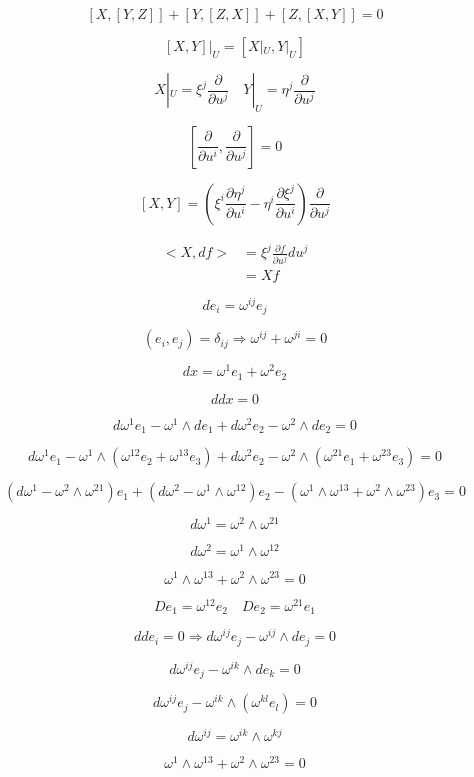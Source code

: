 \documentclass[12pt,a4paper]{article}
\begin{document}
\[
[X,[Y,Z]] + [Y,[Z,X]]+[Z,[X,Y]] = 0
\]


\[
[X,Y]|_U = [X|_U,Y|_U]
\]

\[
X|_U = \xi^j\frac{\partial}{\partial u^j} \quad Y|_U = \eta^j\frac{\partial}{\partial u^j} 
\]


\[
 [\frac{\partial}{\partial u^i},\frac{\partial}{\partial u^j}] = 0
\]

\[
[X,Y] = (\xi^i\frac{\partial\eta^j}{\partial u^i} - \eta^i\frac{\partial\xi^j}{\partial u^i})\frac{\partial}{\partial u^j} 
\]




\begin{align*}
<X,df> &=  \displaystyle \xi^j\frac{\partial f}{\partial u^j}du^j\\
& = Xf
\end{align*}






\[
de_i = \omega^{ij}e_j
\]

\[
(e_i,e_j) = \delta_{ij} \Rightarrow \omega^{ij} + \omega^{ji} = 0
\]

\[
dx = \omega^1 e_1 + \omega^2 e_2
\]

\[
ddx = 0
\]

\[
d\omega^1 e_1 - \omega^1 \wedge de_1 + d\omega^2 e_2 - \omega^2 \wedge de_2 = 0
\]

\[
d\omega^1 e_1 - \omega^1 \wedge (\omega^{12}e_2+\omega^{13}e_3) + d\omega^2 e_2 -  \omega^2 \wedge (\omega^{21}e_1+\omega^{23}e_3) = 0
\]

\[
(d\omega^1-\omega^2 \wedge \omega^{21}) e_1 + (d\omega^2 - \omega^1 \wedge \omega^{12}) e_2 - (\omega^1 \wedge \omega^{13} + \omega^2 \wedge \omega^{23}) e_3= 0
\]

\[
d\omega^1 = \omega^2 \wedge \omega^{21} 
\]

\[ 
d \omega^2 = \omega^1 \wedge \omega^{12}
\]

\[
 \omega^1 \wedge \omega^{13} + \omega^2 \wedge \omega^{23} = 0
\]


\[
De_1= \omega^{12}e_2 \quad De_2 = \omega^{21}e_1
\]

\[
dde_i = 0 \Rightarrow d\omega^{ij} e_j - \omega^{ij} \wedge de_j = 0
\]

\[
d\omega^{ij} e_j - \omega^{ik} \wedge de_k = 0
\]

\[
d\omega^{ij} e_j - \omega^{ik} \wedge (\omega^{kl}e_l) = 0
\]

\[
d\omega^{ij} = \omega^{ik} \wedge \omega^{kj}
\]

\[
\omega^1 \wedge \omega^{13} + \omega^2 \wedge \omega^{23} = 0 
\]
\end{document}

